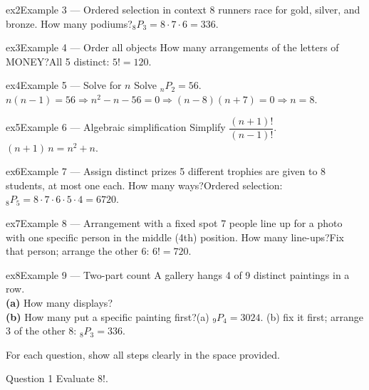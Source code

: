 \documentclass[11pt]{article}
\begin{document}
\begin{example}{ex2}{Example 3 --- Ordered selection in context}
8 runners race for gold, silver, and bronze. How many podiums?\soln $_8P_3=8\cdot7\cdot6=336$.
\end{example}

\begin{example}{ex3}{Example 4 --- Order all objects}
How many arrangements of the letters of MONEY?\soln All 5 distinct: $5!=120$.
\end{example}

\begin{example}{ex4}{Example 5 --- Solve for $n$}
Solve $_nP_2=56$.\soln $n(n-1)=56\Rightarrow n^2-n-56=0\Rightarrow(n-8)(n+7)=0\Rightarrow n=8$.
\end{example}

\begin{example}{ex5}{Example 6 --- Algebraic simplification}
Simplify $\dfrac{(n+1)!}{(n-1)!}$.\soln $(n+1)\,n=n^2+n$.
\end{example}

\begin{example}{ex6}{Example 7 --- Assign distinct prizes}
5 different trophies are given to 8 students, at most one each. How many ways?\soln Ordered selection: $_8P_5=8\cdot7\cdot6\cdot5\cdot4=6720$.
\end{example}

\begin{example}{ex7}{Example 8 --- Arrangement with a fixed spot}
7 people line up for a photo with one specific person in the middle (4th) position. How many line-ups?\soln Fix that person; arrange the other 6: $6!=720$.
\end{example}

\begin{example}{ex8}{Example 9 --- Two-part count}
A gallery hangs 4 of 9 distinct paintings in a row. \\ \textbf{(a)} How many displays? \\ \textbf{(b)} How many put a specific painting first?\soln (a) $_9P_4=3024$. (b) fix it first; arrange 3 of the other 8: $_8P_3=336$.
\end{example}

\clearpage
{}
For each question, show all steps clearly in the space provided.

\begin{qbox}{Question 1}
Evaluate $8!$.\workspace{2.4cm}
\end{qbox}
\end{document}
